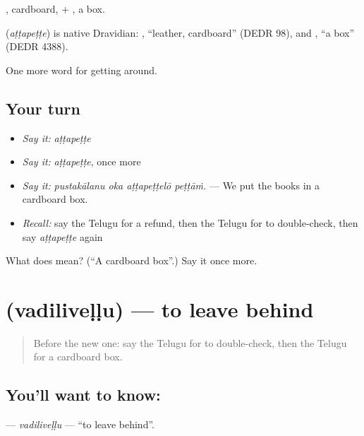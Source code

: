 , cardboard, + , a box.

\begin{cousinweb}
\textbf{} (\emph{aṭṭapeṭṭe}) is native Dravidian: , \textquotedblleft{}leather, cardboard\textquotedblright{} (DEDR 98), and , \textquotedblleft{}a box\textquotedblright{} (DEDR 4388).
\end{cousinweb}

\begin{grammarlens}[title={What you've built}]
One more word for getting around.
\end{grammarlens}

\subsection*{Your turn}
\begin{itemize}
\raggedright
  \item \emph{Say it:} \emph{aṭṭapeṭṭe}
  \item \emph{Say it:} \emph{aṭṭapeṭṭe}, once more
  \item \emph{Say it:} \emph{pustakālanu oka aṭṭapeṭṭelō peṭṭāṁ.} — We put the books in a cardboard box.
  \item \emph{Recall:} say the Telugu for a refund, then the Telugu for to double-check, then say \emph{aṭṭapeṭṭe} again
\end{itemize}

\begin{tcolorbox}[breakable,colback=teal!4,colframe=teal!35!black,title={Before you move on}]
What does  mean? (\textquotedblleft{}A cardboard box\textquotedblright{}.) Say it once more.
\end{tcolorbox}
\section[\texorpdfstring{\te{వదిలివెళ్ళు} (vadiliveḷḷu)}{వదిలివెళ్ళు (vadiliveḷḷu)}]{ (vadiliveḷḷu) — to leave behind}

\label{lesson:TE-C461-vadilivellu}



\begin{quote}
Before the new one: say the Telugu for to double-check, then the Telugu for a cardboard box.
\end{quote}

\subsection*{You'll want to know: }
\textbf{} — \emph{vadiliveḷḷu} — \textquotedblleft{}to leave behind\textquotedblright{}.

